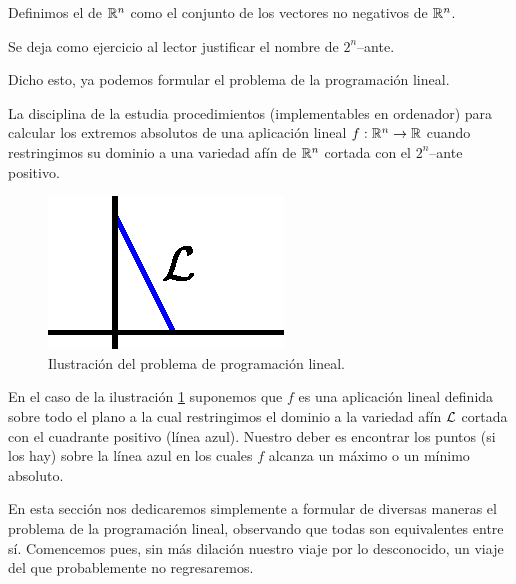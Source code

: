 \begin{defi}
	Definimos el  de $\mathbb{R}^n$ como el conjunto de los vectores no negativos de $\mathbb{R}^n$.
	
	Se deja como ejercicio al lector justificar el nombre de $2^n$--ante.
\end{defi}
Dicho esto, ya podemos formular el problema de la programación lineal.
\begin{prob}
	\label{fund_prob_formulacionGeneral}
	La disciplina de la  estudia procedimientos (implementables en ordenador) para calcular los extremos absolutos de una aplicación lineal $f:\mathbb{R}^n\to\mathbb{R}$ cuando restringimos su dominio a una variedad afín de $\mathbb{R}^n$ cortada con el $2^n$--ante positivo.
	
	\begin{figure}[h!]
		\centering
		\label{fund_img_problemaGeneral}
		\includegraphics[scale = 0.75]{img/problemaGeneral}
		\caption{Ilustración del problema de programación lineal.}
	\end{figure}
	En el caso de la ilustración \ref{fund_img_problemaGeneral} suponemos que $f$ es una aplicación lineal definida sobre todo el plano a la cual restringimos el dominio a la variedad afín $\mathcal{L}$ cortada con el cuadrante positivo (línea azul). Nuestro deber es encontrar los puntos (si los hay) sobre la línea azul en los cuales $f$ alcanza un máximo o un mínimo absoluto.
\end{prob} 
En esta sección nos dedicaremos simplemente a formular de diversas maneras el problema de la programación lineal, observando que todas son equivalentes entre sí. Comencemos pues, sin más dilación nuestro viaje por lo desconocido, un viaje del que probablemente no regresaremos.

